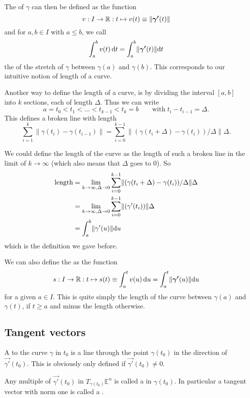 The  of $\gamma$ can then be defined as the function
\[ v: I \to \mathbb{R}: t \mapsto v(t) \equiv \lVert\bm{\mathrm{\gamma'}}(t)\lVert \]
and for $a,b \in I$ with $a\leq b$, we call
\[ \int^b_a v(t) \operatorname{d \!}{t} = \int^b_a \lVert \bm{\mathrm{\gamma'}}(t) \lVert \operatorname{d \!}{t} \]
the  of the stretch of $\gamma$ between $\gamma(a)$ and $\gamma(b)$. This corresponds to our intuitive notion of length of a curve.

\begin{note}
Another way to define the length of a curve, is by dividing the interval $[a,b]$ into $k$ sections, each of length $\Delta$. Thus we can write
\[ a = t_0 < t_1 < \ldots < t_{k-1} < t_k = b \qquad \text{with} \; t_i - t_{i-1} = \Delta. \]
This defines a broken line with length
\[ \sum^k_{i=1} \lVert \gamma(t_i) - \gamma(t_{i-1})\lVert  = \sum^{k-1}_{i=0} \lVert (\gamma(t_i+ \Delta) - \gamma(t_{i})) / \Delta \lVert \Delta. \]

We could define the length of the curve as the length of such a broken line in the limit of $k \to \infty$ (which also means that $\Delta$ goes to $0$). So
\begin{align*}
\text{length} &= \lim_{k\to\infty, \Delta\to 0} \sum^{k-1}_{i=0} \lVert (\gamma(t_i+ \Delta) - \gamma(t_{i})) / \Delta \lVert \Delta \\
&= \lim_{k\to\infty, \Delta\to 0}\sum^{k-1}_{i=0} \lVert (\gamma'(t_i)) \lVert \Delta \\
&= \int^b_a \lVert \gamma'(u) \lVert \operatorname{d \!}{u}
\end{align*}
which is the definition we gave before.
\end{note}

We can also define the  as the function
\[ s: I \to \mathbb{R}: t\mapsto s(t) \equiv \int_a^t v(u) \operatorname{d \!}{u} = \int_a^t \lVert \bm{\mathrm{\gamma'}}(u)\lVert \operatorname{d \!}{u} \]
for a given $a\in I$. This is quite simply the length of the curve between $\gamma(a)$ and $\gamma(t)$, if $t\geq a$ and minus the length otherwise.

\subsection{Tangent vectors}
A  to the curve $\gamma$ in $t_0$ is a line through the point $\gamma(t_0)$ in the direction of $\vec{\gamma'}(t_0)$. This is obviously only defined if $\vec{\gamma'}(t_0) \neq 0$.

Any multiple of $\vec{\gamma'}(t_0)$ in $T_{\gamma(t_0)}\mathbb{E}^n$ is called a  in $\gamma(t_0)$. In particular a tangent vector with norm one is called a .

